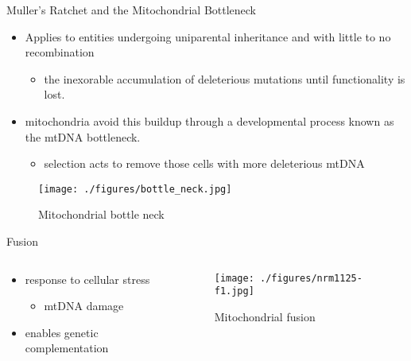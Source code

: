 \documentclass[presentation, smaller]{beamer}
\begin{document}
\begin{frame}[label={sec:org6471f9a}]{Muller's Ratchet and the Mitochondrial Bottleneck}
\begin{itemize}
\item Applies to entities undergoing uniparental inheritance and with little to no
recombination
\begin{itemize}
\item the inexorable accumulation of deleterious mutations until functionality
is lost.
\end{itemize}
\item mitochondria avoid this buildup through a developmental process
known as the mtDNA bottleneck. 
\begin{itemize}
\item selection acts to remove those cells with more deleterious mtDNA
\end{itemize}
\end{itemize}

\begin{figure}[htbp]
\centering
\texttt{[image: ./figures/bottle\_neck.jpg]}
\caption[bottle]{\label{fig:orgecae6c1}
Mitochondrial bottle neck}
\end{figure}
\end{frame}


\begin{frame}[label={sec:org7737bed}]{Fusion}
\begin{columns}
\begin{column}{0.5\columnwidth}
\begin{itemize}
\item response to cellular stress
\begin{itemize}
\item mtDNA damage
\end{itemize}
\item enables genetic complementation
\end{itemize}
\end{column}

\begin{column}{0.5\columnwidth}
\begin{figure}[htbp]
\centering
\texttt{[image: ./figures/nrm1125-f1.jpg]}
\caption[fusion]{\label{fig:org802d697}
Mitochondrial fusion}
\end{figure}
\end{column}
\end{columns}
\end{frame}
\end{document}
